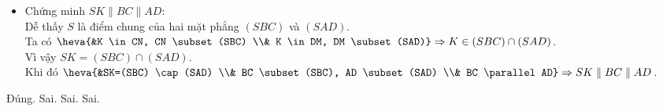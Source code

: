 \begin{ex}
{\begin{itemize}
   Vậy $SN=NE=EB$  hay $SN=\dfrac{1}{3} SB$.\\
   Hoàn toàn tương tự, ta chứng minh  được $SM=\dfrac{1}{3} SA$.\\
   Khi đó  hai tam giác $SMN$, $SAB$ đồng dạng vì có góc $S$ chung và $\dfrac{SM}{SA}=\dfrac{SN}{SB}=\dfrac{1}{3}$.\\
   Xét tam giác $SAB$, theo  định lí Thalès, ta có
    $\dfrac{MN}{AB}=\dfrac{SM}{SA}=\dfrac{1}{3} \Rightarrow MN=\dfrac{AB}{3}=\dfrac{a}{3}$.
   \item Chứng minh $SK \parallel BC \parallel  AD$:\\
   Dễ thấy  $S$ là điểm chung của hai mặt phẳng $(SBC)$ và $(SAD)$.\\
   Ta có $\heva{&K \in CN, CN \subset(SBC) \\& K  \in DM, DM \subset(SAD)} \Rightarrow K \in(SBC) \cap(SAD)$.\\
   Vì  vậy $SK=(SBC) \cap(SAD)$.\\
   Khi đó $\heva{&SK=(SBC) \cap(SAD) \\& BC \subset(SBC), AD \subset(SAD) \\& BC \parallel AD}\Rightarrow  SK \parallel BC \parallel AD$.
  \end{itemize}
  \begin{itemchoice}
   \itemch  Đúng.
   \itemch  Sai.
    \itemch Sai.
   \itemch  Sai.
  \end{itemchoice}
  }
\end{ex}

